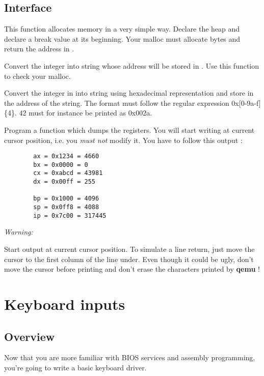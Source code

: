 \subsection*{Interface}
{
  This function allocates memory in a very simple way. Declare the heap and
  declare a break value at its beginning.
  Your malloc must allocate  bytes and return the address
  in .
}

{
  Convert the integer  into string whose address will be
  stored in . Use this function to check your malloc.
}

{
  Convert the integer in  into string using hexadecimal
  representation and store in  the address of the string.
  The format must follow the regular expression 0x[0-9a-f]\{4\}.
  42 must for instance be printed as 0x002a.
}

{
  Program a function which dumps the registers. You will start writing
  at current cursor position, i.e. you \emph{must not} modify it. You have to
  follow this output :
}
\begin{verbatim}
        ax = 0x1234 = 4660
        bx = 0x0000 = 0
        cx = 0xabcd = 43981
        dx = 0x00ff = 255

        bp = 0x1000 = 4096
        sp = 0x0ff8 = 4088
        ip = 0x7c00 = 317445
\end{verbatim}

\function{}{}
{
  {\em Warning:}

  Start output at current cursor position. To simulate a line return, just move
  the cursor to the first column of the line under. Even though it could be
  ugly, don't move the cursor before printing and don't erase the characters
  printed by \textbf{qemu} !
}

%
%

\newpage

\section{Keyboard inputs}

\subsection*{Overview}
Now that you are more familiar with BIOS services and assembly programming,
you're going to write a basic keyboard driver.


